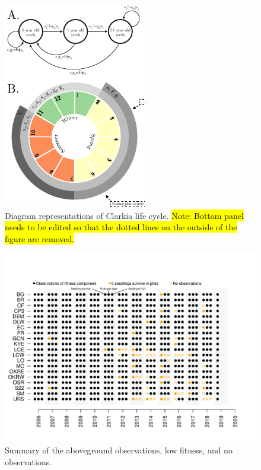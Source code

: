 \documentclass[12pt, oneside, titlepage]{article}   	%
\begin{document}
{\fi
\begin{figure}[h]
   \centering
       \includegraphics[scale=2]{../manuscript/figures/model-figure.pdf}  
        \caption{ Diagram representations of Clarkia life cycle. \hl{Note: Bottom panel needs to be edited so that the dotted lines on the outside of the figure are removed.} }
        \label{fig:life-cycle}
\end{figure}


\begin{figure}[!h]
       \includegraphics[width=\textwidth]{../figures/analysis/zero-fitness.pdf}  
    \caption{ Summary of the aboveground observations, low fitness, and no observations. }
 \label{fig:zero-fitness}
\end{figure}


}
\end{document}
